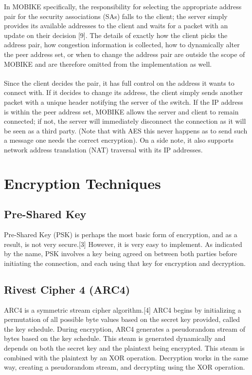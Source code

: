 \documentclass[runningheads]{llncs}
\begin{document}
In MOBIKE specifically, the responsibility for selecting the appropriate address pair for the security associations (SAs) falls to the client; the server simply provides its available addresses to the client and waits for a packet with an update on their decision [9]. The details of exactly how the client picks the address pair, how congestion information is collected, how to dynamically alter the peer address set, or when to change the address pair are outside the scope of MOBIKE and are therefore omitted from the implementation as well.\\
\\
Since the client decides the pair, it has full control on the address it wants to connect with. If it decides to change its address, the client simply sends another packet with a unique header notifying the server of the switch. If the IP address is within the peer address set, MOBIKE allows the server and client to remain connected; if not, the server will immediately disconnect the connection as it will be seen as a third party. (Note that with AES this never happens as to send such a message one needs the correct encryption). On a side note, it also supports network address translation (NAT) traversal with its IP addresses.
\section{Encryption Techniques}
\subsection{Pre-Shared Key}
Pre-Shared Key (PSK) is perhaps the most basic form of encryption, and as a result, is not very secure.[3] However, it is very easy to implement. As indicated by the name, PSK involves a key being agreed on between both parties before initiating the connection, and each using that key for encryption and decryption.
\subsection{Rivest Cipher 4 (ARC4)}
ARC4 is a symmetric stream cipher algorithm.[4] ARC4 begins by initializing a permutation of all possible byte values based on the secret key provided, called the key schedule. During encryption, ARC4 generates a pseudorandom stream of bytes based on the key schedule. This steam is generated dynamically and depends on both the secret key and the plaintext being encrypted. This steam is combined with the plaintext by an XOR operation. Decryption works in the same way, creating a pseudorandom stream, and decrypting using the XOR operation.
\end{document}
